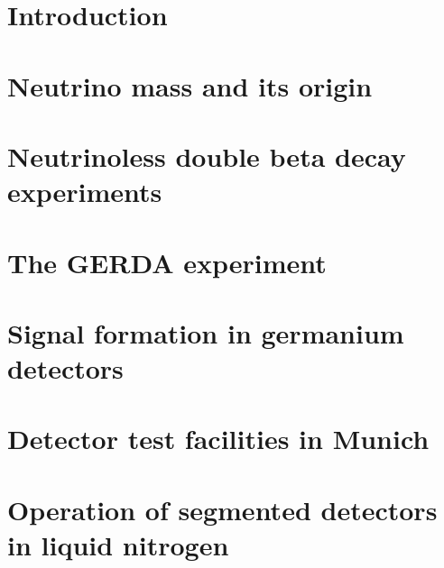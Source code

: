 \documentclass[11pt,a4paper]{book}
\begin{document}
\pagestyle{empty}



\cleardoublepage



\cleardoublepage \setcounter{page}{1} 

\tableofcontents

\cleardoublepage \setcounter{page}{1} 

\pagestyle{headings}

\chapter{Introduction}
\label{cha:intro}

\clearpage{\pagestyle{empty}\cleardoublepage}

\chapter{Neutrino mass and its origin}
\label{cha:theory}

\clearpage{\pagestyle{empty}\cleardoublepage}

\chapter{Neutrinoless double beta decay experiments}
\label{cha:exps}

\clearpage{\pagestyle{empty}\cleardoublepage}

\chapter{The GERDA experiment}
\label{cha:gerda}

\clearpage{\pagestyle{empty}\cleardoublepage}

\chapter{Signal formation in germanium detectors}
\label{cha:detector}

\clearpage{\pagestyle{empty}\cleardoublepage}

\chapter{Detector test facilities in Munich}
\label{cha:teststand}

\clearpage{\pagestyle{empty}\cleardoublepage}

\chapter[Operation of segmented detectors in LN$_{2}$]{Operation of segmented detectors in liquid nitrogen}
\label{cha:GII}

\clearpage{\pagestyle{empty}\cleardoublepage}
\end{document}
